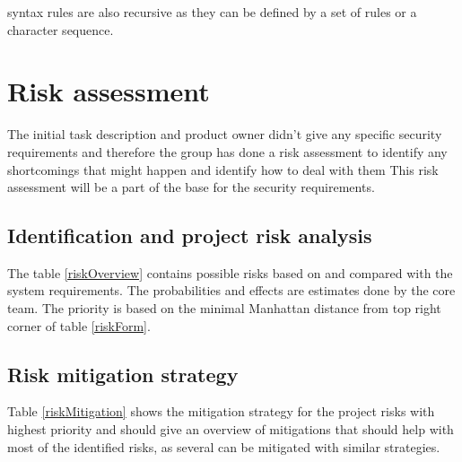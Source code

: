 \Gls{syntax} rules are also \gls{recursive} as they can be defined by a set of rules or a character sequence.

\section{Risk assessment}

The initial task description and product owner didn't give any specific security requirements and therefore the group has done a risk assessment to identify any shortcomings that might happen and identify how to deal with them This risk assessment will be a part of the base for the security requirements.

\subsection{Identification and project risk analysis}

The table \ref{riskOverview} contains possible risks based on \cite{DBLP:journals/corr/abs-1708-02174} and compared with the system requirements. The probabilities and effects are estimates done by the core team. The priority is based on the minimal Manhattan distance from top right corner of table \ref{riskForm}.





\subsection{Risk mitigation strategy}

Table \ref{riskMitigation} shows the mitigation strategy for the project risks with highest priority and should give an overview of mitigations that should help with most of the identified risks, as several can be mitigated with similar strategies.




